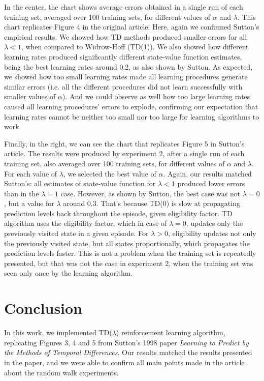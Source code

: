 \documentclass{article}
\begin{document}
In the center, the chart shows average errors obtained in a single run of each training set, averaged over 100 training sets, for different values of $\alpha$ and $\lambda$.
This chart replicates Figure 4 in the original article.
Here, again we confirmed Sutton's empirical results.
We showed how TD methods produced smaller errors for all $\lambda < 1$, when compared to Widrow-Hoff (TD(1)).
We also showed how different learning rates produced significantly different state-value function estimates, being the best learning rates around 0.2, as also shown by Sutton.
As expected, we showed how too small learning rates made all learning procedures generate similar errors (i.e. all the different procedures did not learn successfully with smaller values of $\alpha$).
And we could observe as well how too large learning rates caused all learning procedures' errors to explode, confirming our expectation that learning rates cannot be neither too small nor too large for learning algorithms to work.

Finally, in the right, we can see the chart that replicates Figure 5 in Sutton's article.
The results were produced by experiment 2, after a single run of each training set, also averaged over 100 training sets, for different values of $\alpha$ and $\lambda$.
For each value of $\lambda$, we selected the best value of $\alpha$.
Again, our results matched Sutton's: all estimates of state-value function for $\lambda < 1$ produced lower errors than in the $\lambda = 1$ case.
However, as shown by Sutton, the best case was not $\lambda = 0$, but a value for $\lambda$ around 0.3.
That's because TD(0) is slow at propagating prediction levels back throughout the episode, given eligibility factor.
TD algorithm uses the eligibility factor, which in case of $\lambda = 0$, updates only the previously visited state in a given episode.
For $\lambda > 0$, eligibility updates not only the previously visited state, but all states proportionally, which propagates the prediction levels faster.
This is not a problem when the training set is repeatedly presented, but that was not the case in experiment 2, when the training set was seen only once by the learning algorithm.

\section{Conclusion}
\label{sec:conclusion}
In this work, we implemented TD($\lambda$) reinforcement learning algorithm, replicating Figures 3, 4 and 5 from Sutton's 1998 paper \emph{Learning to Predict by the Methods of Temporal Differences}.
Our results matched the results presented in the paper, and we were able to confirm all main points made in the article about the random walk experiments.



\end{document}
